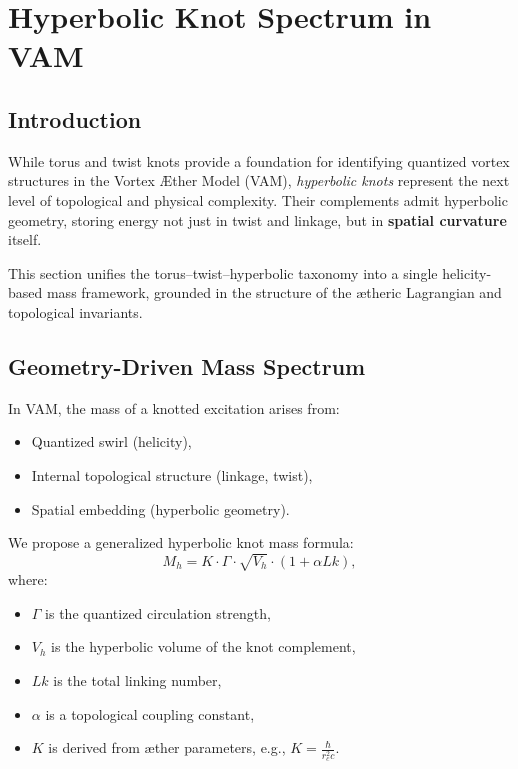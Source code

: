 \documentclass[a4paper,12pt]{article}
\begin{document}
\section{Hyperbolic Knot Spectrum in VAM}
\label{sec:hyperbolic_knot_spectrum}

        \subsection{Introduction}

        While torus and twist knots provide a foundation for identifying quantized vortex structures in the Vortex Æther Model (VAM), \emph{hyperbolic knots} represent the next level of topological and physical complexity. Their complements admit hyperbolic geometry, storing energy not just in twist and linkage, but in \textbf{spatial curvature} itself.

        This section unifies the torus--twist--hyperbolic taxonomy into a single helicity-based mass framework, grounded in the structure of the ætheric Lagrangian and topological invariants.

        \subsection{Geometry-Driven Mass Spectrum}

        In VAM, the mass of a knotted excitation arises from:
        \begin{itemize}
            \item Quantized swirl (helicity),
            \item Internal topological structure (linkage, twist),
            \item Spatial embedding (hyperbolic geometry).
        \end{itemize}

        We propose a generalized hyperbolic knot mass formula:
        \begin{equation}
            M_h = K \cdot \Gamma \cdot \sqrt{V_h} \cdot \left(1 + \alpha Lk\right),
        \end{equation}
        where:
        \begin{itemize}
            \item $\Gamma$ is the quantized circulation strength,
            \item $V_h$ is the hyperbolic volume of the knot complement,
            \item $Lk$ is the total linking number,
            \item $\alpha$ is a topological coupling constant,
            \item $K$ is derived from æther parameters, e.g., $K = \frac{\hbar}{r_c^2 c}$.
        \end{itemize}
\end{document}
